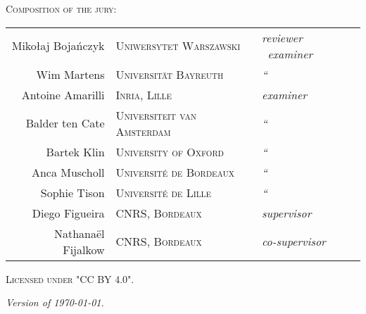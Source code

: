 \newpage
\thispagestyle{empty}
~
\newpage
\thispagestyle{empty}
\begin{fullwidth}
	\setlength{\parindent}{0pt}
	~\vfill
	\begin{center}
		\normalfont\Large\scshape Composition of the jury:\\[1.5em]
		\normalfont
		\begin{tabular}{r@{\hskip 1em}l@{\hskip 1em}l}
		  Mikołaj Bojańczyk & \textsc{\small Uniwersytet Warszawski} & \emph{reviewer {\small\fancyand}~examiner}\\
		  Wim Martens & \textsc{\small Universität Bayreuth} & \emph{\hphantom{revi}``} \\[.5em]
		  Antoine Amarilli & \textsc{\small Inria, Lille} & \emph{examiner}\\
		  Balder ten Cate & \textsc{\small Universiteit van Amsterdam} & \emph{\hphantom{revi}``}\\
		  Bartek Klin & \textsc{\small University of Oxford} & \emph{\hphantom{revi}``}\\
		  Anca Muscholl & \textsc{\small Université de Bordeaux} & \emph{\hphantom{revi}``}\\
		  Sophie Tison & \textsc{\small Université de Lille} & \emph{\hphantom{revi}``}\\[.5em]
		  Diego Figueira & \textsc{\small CNRS, Bordeaux} & \emph{supervisor}\\
		  Nathanaël Fijalkow & \textsc{\small CNRS, Bordeaux} & \emph{co-supervisor}
		\end{tabular}
	\end{center}

	\vfill

	\par\textsc{Licensed under "CC BY 4.0".}
	\par\textit{Version of \today.}
\end{fullwidth}